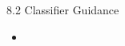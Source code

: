 \begin{frame}{8.2 Classifier Guidance}
    \begin{itemize}
        \item
    \end{itemize}
\end{frame}
